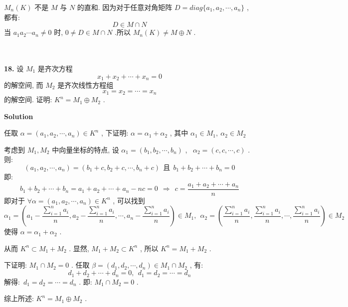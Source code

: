\documentclass[11pt,a4paper,openany,oneside]{book}
\newcommand\Solution{\noindent\textbf{\textsf{Solution}}\par\medskip}
\begin{document}
 $ M_n(K) $ 不是 $ M $ 与 $ N $ 的直和. 因为对于任意对角矩阵 $ D = diag\{a_1, a_2, \cdots, a_n\} $ , 都有:
 $$  D \in M \cap N  $$ 
\hspace{1.7em} 当 $ a_1a_2\cdots a_n \neq 0 $ 时,  $ 0 \neq D \in M \cap N $ .所以 $ M_n(K) \neq M \oplus  N $ . \\  \\ \\



\begin{myexample}
	\textbf{18.} 
设 $ M_1 $ 是齐次方程
 $$  x_1 + x_2 + \cdots + x_n = 0  $$ 
的解空间, 而 $ M_2 $ 是齐次线性方程组
 $$  x_1 = x_2 = \cdots = x_n  $$ 
的解空间. 证明:  $  K^n = M_1 \oplus  M_2  $ .  \\  

\end{myexample}
\Solution 

任取 $ \alpha = (a_1, a_2, \cdots, a_n) \in K^n $ , 下证明:  $ \alpha = \alpha_1 + \alpha_2 $ , 其中  $ \alpha_1 \in M_1, \ \alpha_2 \in M_2 $  

考虑到 $ M_1, M_2 $ 中向量坐标的特点, 设 $ \alpha_1 = (b_1, b_2, \cdots, b_n) $ , \  $ \alpha_2 = (c, c, \cdots, c) $ . 则: 
 $$  (a_1, a_2, \cdots, a_n) = (b_1 + c, b_2 + c, \cdots, b_n + c) \ \ \text{且} \ \ b_1 + b_2 + \cdots + b_n = 0  $$ 
即: 
 $$  b_1 + b_2 + \cdots + b_n = a_1 + a_2 + \cdots + a_n - nc = 0 \ \ \Rightarrow \ \ c = \dfrac{a_1 + a_2 + \cdots + a_n}{n}  $$ 
即对于 $ \forall \alpha=(a_1, a_2, \cdots, a_n) \in K^n $ , 可以找到
 $$ \alpha_1 = \left(a_1 - \frac{\sum\limits_{i=1}^{n}a_i}{n}, a_2 -\frac{\sum\limits_{i=1}^{n}a_i}{n}, \cdots, a_n-\frac{\sum\limits_{i=1}^{n}a_i}{n} \right) \in M_1, \ \  \alpha_2 = \left(\frac{\sum\limits_{i=1}^{n}a_i}{n}, \frac{\sum\limits_{i=1}^{n}a_i}{n}, \cdots, \frac{\sum\limits_{i=1}^{n}a_i}{n} \right) \in M_2 $$ 
使得 $ \alpha = \alpha_1 + \alpha_2 $ . 

从而 $ K^n \subset M_1 + M_2 $ . 显然,  $ M_1 + M_2 \subset K^n $ , 所以  $ K^n = M_1 + M_2 $ .  

下证明:  $ M_1 \cap M_2 = 0 $ . 任取 $ \beta = (d_1, d_2, \cdots, d_n) \in M_1 \cap M_2 $ , 有:
 $$  d_1 + d_2 + \cdots + d_n = 0, \ \ d_1 = d_2 = \cdots = d_n  $$ 
解得:\  $ d_1 = d_2 = \cdots = d_n $ . 即:  $ M_1 \cap M_2 = 0 $ .

综上所述:  $ K^n = M_1 \oplus  M_2 $ .   \\  \\  \\ 
\end{document}
